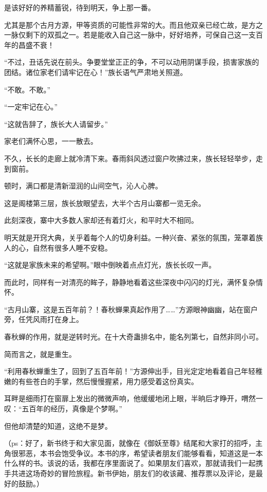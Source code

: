 \begin{this_body}
是该好好的养精蓄锐，待到明天，争上那一番。

尤其是那个古月方源，甲等资质的可能性非常的大。而且他双亲已经亡故，是方之一脉仅剩下的双孤之一。若是能收入自己这一脉中，好好培养，可保自己这一支百年的昌盛不衰！

“不过，丑话先说在前头。争要堂堂正正的争，不可以动用阴谋手段，损害家族的团结。诸位家老们请牢记在心！”族长语气严肃地关照道。

“不敢。不敢。”

“一定牢记在心。”

“这就告辞了，族长大人请留步。”

家老们满怀心思，一一散去。

不久，长长的走廊上就冷清下来。春雨斜风透过窗户吹拂过来，族长轻轻举步，走到窗前。

顿时，满口都是清新湿润的山间空气，沁人心脾。

这是阁楼第三层，族长放眼望去，大半个古月山寨都一览无余。

此刻深夜，寨中大多数人家却还有着灯火，和平时大不相同。

明天就是开窍大典，关乎着每个人的切身利益。一种兴奋、紧张的氛围，笼罩着族人的心，自然有很多人睡不安稳。

“这就是家族未来的希望啊。”眼中倒映着点点灯光，族长长叹一声。

而此时，同样有一对清亮的眸子，静静地看着这些深夜中闪闪的灯光，满怀复杂情怀。

“古月山寨，这是五百年前？！春秋蝉果真起作用了……”方源眼神幽幽，站在窗户旁，任凭风雨打在身上。

春秋蝉的作用，就是逆转时光。在十大奇蛊排名中，能名列第七，自然非同小可。

简而言之，就是重生。

“利用春秋蝉重生了，回到了五百年前！”方源伸出手，目光定定地看着自己年轻稚嫩的有些苍白的手掌，然后慢慢握紧，用力感受着这份真实。

耳畔是细雨打在窗扉上发出的微微声响，他缓缓地闭上眼，半晌后才睁开，喟然一叹：“五百年的经历，真像是个梦啊。”

但他却清楚的知道，这绝不是梦。

（ps：好了，新书终于和大家见面，就像在《御妖至尊》结尾和大家打的招呼，主角很邪恶，本书会饱受争议。本书的序，希望读者朋友们能够看看，知道这是一本什么样的书。该说的话，我都在序里面说了。如果朋友们喜欢，那就请我们一起携手共进这场奇妙的冒险旅程。新书伊始，朋友们的收该藏、推荐票以及评论，是最好的鼓励。）

\end{this_body}


